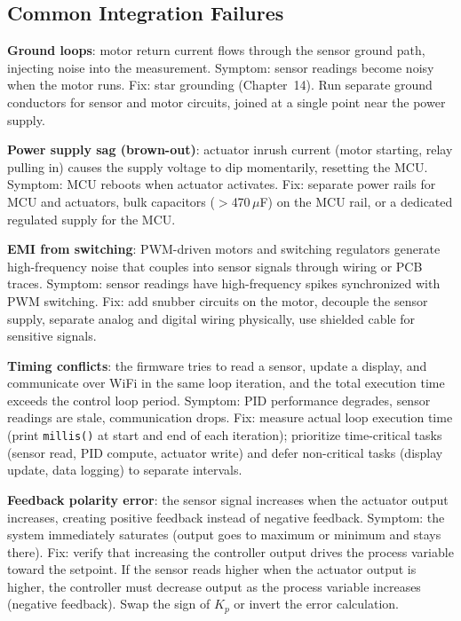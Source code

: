 \documentclass[11pt,letterpaper,twoside,openany]{book}
\begin{document}
\subsection{Common Integration Failures}

\textbf{Ground loops}: motor return current flows through the sensor ground path, injecting noise into the measurement. Symptom: sensor readings become noisy when the motor runs. Fix: star grounding (Chapter~14). Run separate ground conductors for sensor and motor circuits, joined at a single point near the power supply.

\textbf{Power supply sag (brown-out)}: actuator inrush current (motor starting, relay pulling in) causes the supply voltage to dip momentarily, resetting the MCU. Symptom: MCU reboots when actuator activates. Fix: separate power rails for MCU and actuators, bulk capacitors ($>$470\,$\mu$F) on the MCU rail, or a dedicated regulated supply for the MCU.

\textbf{EMI from switching}: PWM-driven motors and switching regulators generate high-frequency noise that couples into sensor signals through wiring or PCB traces. Symptom: sensor readings have high-frequency spikes synchronized with PWM switching. Fix: add snubber circuits on the motor, decouple the sensor supply, separate analog and digital wiring physically, use shielded cable for sensitive signals.

\textbf{Timing conflicts}: the firmware tries to read a sensor, update a display, and communicate over WiFi in the same loop iteration, and the total execution time exceeds the control loop period. Symptom: PID performance degrades, sensor readings are stale, communication drops. Fix: measure actual loop execution time (print \texttt{millis()} at start and end of each iteration); prioritize time-critical tasks (sensor read, PID compute, actuator write) and defer non-critical tasks (display update, data logging) to separate intervals.

\textbf{Feedback polarity error}: the sensor signal increases when the actuator output increases, creating positive feedback instead of negative feedback. Symptom: the system immediately saturates (output goes to maximum or minimum and stays there). Fix: verify that increasing the controller output drives the process variable toward the setpoint. If the sensor reads higher when the actuator output is higher, the controller must decrease output as the process variable increases (negative feedback). Swap the sign of $K_p$ or invert the error calculation.
\end{document}
